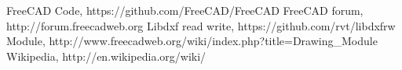 \begin{thebibliography}{9}
\bibitem{} FreeCAD Code, https://github.com/FreeCAD/FreeCAD
\bibitem{} FreeCAD forum, http://forum.freecadweb.org
\bibitem{} Libdxf read write, https://github.com/rvt/libdxfrw
\bibitem{} Module, http://www.freecadweb.org/wiki/index.php?title=Drawing\_Module
\bibitem{} Wikipedia, http://en.wikipedia.org/wiki/
\end{thebibliography}
